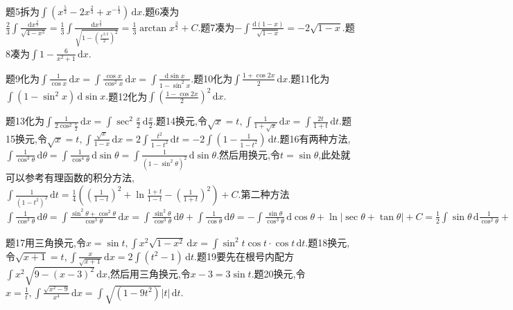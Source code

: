 题5拆为$\int \left(x^{\frac{5}{3}}-2x^{\frac{2}{3}}+x^{-\frac{1}{3}}\right) \,\mathrm{d}x .$题6凑为$\frac{2}{3}\int \frac{\mathrm{d}x^{\frac{3}{2}}}{\sqrt{4-x^3}} =\frac{1}{3}\int \frac{\mathrm{d}x^{\frac{3}{2}}}{\sqrt{1-\left(\frac{x^{3/2}}{2}\right) ^2}} =\frac{1}{3}\arctan x^{\frac{3}{2}}+C$.题7凑为$-\int \frac{\mathrm{d}(1-x)}{\sqrt{1-x}} =-2\sqrt{1-x}.$题8凑为$\int 1-\frac{6}{x^2+1} \,\mathrm{d}x .$

题9化为$\int \frac{1}{\cos x} \,\mathrm{d}x =\int \frac{\cos x}{\cos ^2x} \,\mathrm{d}x=\int \frac{\mathrm{d}\sin x}{1-\sin ^2x} .$题10化为$\int \frac{1+\cos 2x}{2} \,\mathrm{d}x .$题11化为$\int (1-\sin ^2x) \,\mathrm{d}\sin x .$题12化为$\int \left(\frac{1-\cos 2x}{2}\right) ^2 \,\mathrm{d}x .$

题13化为$\int \frac{1}{2\cos ^2\frac{x}{2}} \,\mathrm{d}x =\int \sec ^2\frac{x}{2} \,\mathrm{d}\frac{x}{2} .$题14换元,令$\sqrt{x}=t,\int \frac{1}{1+\sqrt{x}} \,\mathrm{d}x =\int \frac{2t}{1+t} \,\mathrm{d}t .$题15换元,令$\sqrt{x}=t,\int \frac{\sqrt{x}}{1-x} \,\mathrm{d}x =2\int \frac{t^2}{1-t^2} \,\mathrm{d}t =-2\int \left( 1-\frac{1}{1-t^2} \right) \,\mathrm{d}t .$题16有两种方法,$\int \frac{1}{\cos ^3\theta} \,\mathrm{d}\theta=\int \frac{1}{\cos ^4\theta} \,\mathrm{d}\sin \theta =\int \frac{1}{(1-\sin ^2\theta)^2} \,\mathrm{d}\sin \theta .$然后用换元,令$t=\sin \theta$,此处就可以参考有理函数的积分方法,$\int \frac{1}{(1-t^2)^2} \,\mathrm{d}t =\frac{1}{4}\left(\left(\frac{1}{1-t}\right) ^2+\ln \frac{1+t}{1-t}-\left(\frac{1}{1+t}\right) ^2\right) +C$.第二种方法$\int \frac{1}{\cos ^3\theta} \,\mathrm{d}\theta=\int \frac{\sin ^2\theta+\cos ^2\theta}{\cos ^3\theta} \,\mathrm{d}x =\int \frac{\sin^2 \theta}{\cos ^3\theta} \,\mathrm{d}\theta+\int \frac{1}{\cos\theta} \,\mathrm{d}\theta =-\int \frac{\sin \theta}{\cos ^3\theta} \,\mathrm{d}\cos \theta +\ln \left\lvert \sec\theta+\tan \theta\right\rvert +C=\frac{1}{2}\int \sin \theta \,\mathrm{d}\frac{1}{\cos^2 \theta} +\ln \left\lvert \sec\theta+\tan \theta\right\rvert +C=\frac{1}{2}\frac{\sin \theta}{\cos^2\theta}-\frac{1}{2}\int \frac{1}{\cos ^2\theta} \,\mathrm{d}\sin \theta +\ln \left\lvert \sec\theta+\tan \theta\right\rvert +C =\frac{1}{2}\frac{\sin \theta}{\cos^2\theta}+\frac{1}{2}\int \frac{1}{\sin ^2\theta-1} \,\mathrm{d}\sin \theta +\ln \left\lvert \sec\theta+\tan \theta\right\rvert +C =\frac{1}{2}\frac{\sin \theta}{\cos^2\theta}+\frac{1}{4}\ln \left\lvert \frac{\sin \theta-1}{\sin \theta+1}\right\rvert  +\ln \left\lvert \sec\theta+\tan \theta\right\rvert +C $

题17用三角换元,令$x=\sin t,\int x^2\sqrt{1-x^2} \,\mathrm{d}x =\int \sin ^2t\cos t\cdot\cos t \,\mathrm{d}t .$题18换元,令$\sqrt{x+1}=t,\int \frac{x}{\sqrt{x+1}} \,\mathrm{d}x=2 \int (t^2-1) \,\mathrm{d}t .$题19要先在根号内配方$\int x^2\sqrt{9-(x-3)^2} \,\mathrm{d}x $,然后用三角换元,令$x-3=3\sin t.$题20换元,令$x=\frac{1}{t},\int \frac{\sqrt{x^2-9}}{x^4} \,\mathrm{d}x=\int \sqrt{(1-9t^2)} \left\lvert t\right\rvert \,\mathrm{d}t .$


